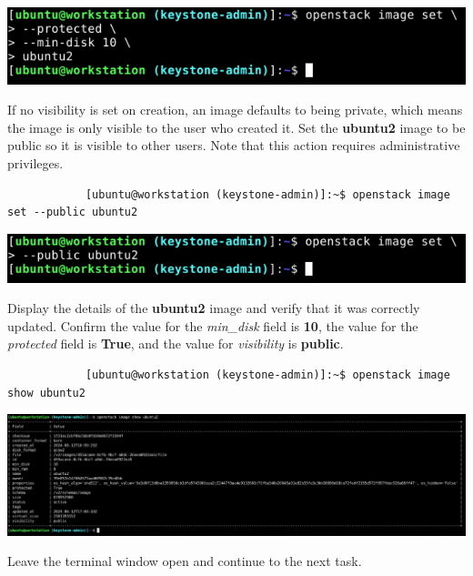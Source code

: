 \documentclass[letterpaper, 12pt]{article}
\begin{document}
\begin{enumerate}
\begin{labstep}
        \begin{center}
            \includegraphics[width=\linewidth]{images/part1/step21.png}
        \end{center}
    \end{labstep}

    \begin{labstep}
        If no visibility is set on creation, an image defaults to being private, which means the image is only visible to the user who created it.
        Set the \textbf{ubuntu2} image to be public so it is visible to other users.
        Note that this action requires administrative privileges.
        \begin{lstlisting}
            [ubuntu@workstation (keystone-admin)]:~$ openstack image set --public ubuntu2
        \end{lstlisting}

        \begin{center}
            \includegraphics[width=\linewidth]{images/part1/step22.png}
        \end{center}
    \end{labstep}

    \begin{labstep}
        Display the details of the \textbf{ubuntu2} image and verify that it was correctly updated.
        Confirm the value for the \textit{min\_disk} field is \textbf{10}, the value for the \textit{protected} field is \textbf{True}, and the value for \textit{visibility} is \textbf{public}.
        \begin{lstlisting}
            [ubuntu@workstation (keystone-admin)]:~$ openstack image show ubuntu2
        \end{lstlisting}

        \begin{center}
            \includegraphics[width=\linewidth]{images/part1/step23.png}
        \end{center}
    \end{labstep}

    \begin{labstep}
        Leave the terminal window open and continue to the next task.
    \end{labstep}

\end{enumerate}
\end{document}
